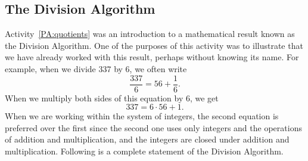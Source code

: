 \subsection*{The Division Algorithm}
%
\typeu Activity~\ref*{PA:quotients} was an introduction to a mathematical result known as the Division Algorithm.  One of the purposes of this \typel activity was to illustrate that we have already worked with this result, perhaps without knowing its name.  For example, when we divide 337 by 6, we often write
\[
\frac{{337}}{6} = 56 + \frac{1}{6}.
\]
When we multiply both sides of this equation by 6, we get
\[
337 = 6 \cdot 56 + 1.
\]
When we are working within the system of integers, the second equation is preferred over the first since the second one uses only integers and the operations of addition and multiplication, and the integers are closed under addition and multiplication.  Following is a complete statement of the Division Algorithm.
%
\begin{flushleft}\label{divalgorithm}
\end{flushleft}


%

